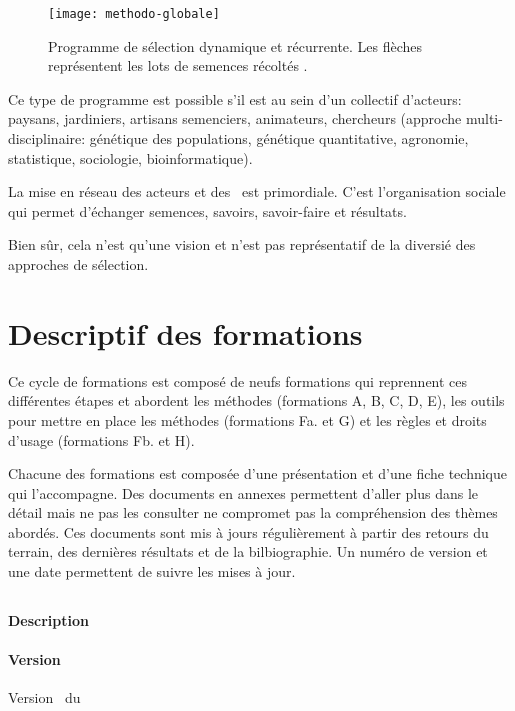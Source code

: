 \begin{figure}[H]
\centering\texttt{[image: methodo-globale]}
\caption{Programme de sélection dynamique et récurrente. Les flèches représentent les lots de semences récoltés \cite{methodo-globale}.}
\label{methodo-globale}
\end{figure}

Ce type de programme est possible s'il est  au sein d'un collectif d'acteurs: paysans, jardiniers, artisans semenciers, animateurs, chercheurs (approche multi-disciplinaire: génétique des populations, génétique quantitative, agronomie, statistique, sociologie, bioinformatique).

La mise en réseau des acteurs et des \MSPs~est primordiale. 
C'est l'organisation sociale qui permet d'échanger semences, savoirs, savoir-faire et résultats.

Bien sûr, cela n'est qu'une vision et n'est pas représentatif de la diversié des approches de sélection.

\section{Descriptif des formations}

Ce cycle de formations est composé de neufs formations qui reprennent ces différentes étapes et abordent les méthodes (formations A, B, C, D, E), les outils pour mettre en place les méthodes (formations Fa. et G) et les règles et droits d'usage (formations Fb. et H).

Chacune des formations est composée d'une présentation et d'une fiche technique qui l'accompagne. 
Des documents en annexes permettent d'aller plus dans le détail mais ne pas les consulter ne compromet pas la compréhension des thèmes abordés.
Ces documents sont mis à jours régulièrement à partir des retours du terrain, des dernières résultats et de la bilbiographie.
Un numéro de version et une date permettent de suivre les mises à jour.

\subsection{\formationA}
\paragraph{Description} \descriptifFA
\paragraph{Version} Version \versionFA~du \dateversionFA

